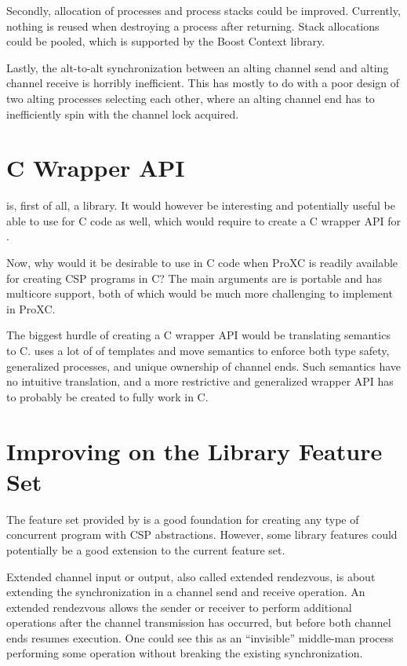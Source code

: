 Secondly, allocation of processes and process stacks could be improved. Currently, nothing is reused when destroying a process after returning. Stack allocations could be pooled, which is supported by the Boost Context library. 

Lastly, the alt\hyp{}to\hyp{}alt synchronization between an alting channel send and alting channel receive is horribly inefficient. This has mostly to do with a poor design of two alting processes selecting each other, where an alting channel end has to inefficiently spin with the channel lock acquired.


\section{C Wrapper API}


\Proxc{} is, first of all, a \Cpp{} library. It would however be interesting and potentially useful be able to use \Proxc{} for C code as well, which would require to create a C wrapper API for \Proxc{}.

Now, why would it be desirable to use \Proxc{} in C code when ProXC is readily available for creating CSP programs in C? The main arguments are \Proxc{} is portable and has multicore support, both of which would be much more challenging to implement in ProXC.

The biggest hurdle of creating a C wrapper API would be translating \Cpp{} semantics to C. \Proxc{} uses a lot of of templates and move semantics to enforce both type safety, generalized processes, and unique ownership of channel ends. Such semantics have no intuitive translation, and a more restrictive and generalized wrapper API has to probably be created to fully work in C.


\section{Improving on the Library Feature Set}


The feature set provided by \Proxc{} is a good foundation for creating any type of concurrent program with CSP abstractions. However, some library features could potentially be a good extension to the current feature set.

Extended channel input or output, also called extended rendezvous, is about extending the synchronization in a channel send and receive operation. An extended rendezvous allows the sender or receiver to perform additional operations after the channel transmission has occurred, but before both channel ends resumes execution. One could see this as an ``invisible'' middle\hyp{}man process performing some operation without breaking the existing synchronization.

